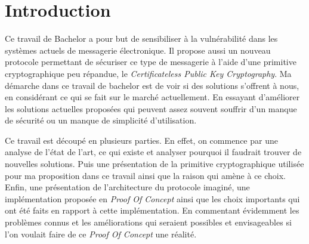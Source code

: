 \chapter{Introduction}
\label{ch:intro}

Ce travail de Bachelor a pour but de sensibiliser à la vulnérabilité dans les systèmes actuels de messagerie électronique. Il propose aussi un nouveau protocole permettant de sécuriser ce type de messagerie à l'aide d'une primitive cryptographique peu répandue, le \textit{Certificateless Public Key Cryptography}. Ma démarche dans ce travail de bachelor est de voir si des solutions s'offrent à nous, en considérant ce qui se fait sur le marché actuellement. En essayant d'améliorer les solutions actuelles proposées qui peuvent assez souvent souffrir d'un manque de sécurité ou un manque de simplicité d'utilisation.

Ce travail est découpé en plusieurs parties. En effet, on commence par une analyse de l'état de l'art, ce qui existe et analyser pourquoi il faudrait trouver de nouvelles solutions. Puis une présentation de la primitive cryptographique utilisée pour ma proposition dans ce travail ainsi que la raison qui amène à ce choix. Enfin, une présentation de l'architecture du protocole imaginé, une implémentation proposée en \textit{Proof Of Concept} ainsi que les choix importants qui ont été faits en rapport à cette implémentation. En commentant évidemment les problèmes connus et les améliorations qui seraient possibles et envisageables si l'on voulait faire de ce \textit{Proof Of Concept} une réalité.